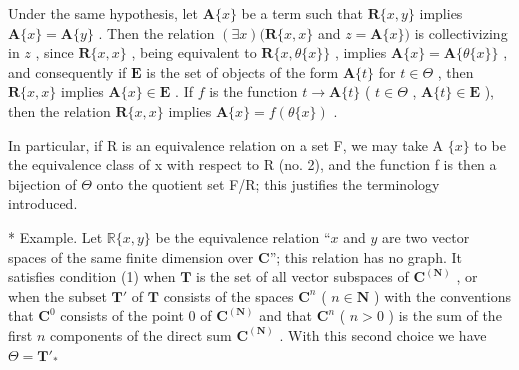 Under the same hypothesis, let \(\mathbf{A}\{x\}\) be a term such that \(\mathbf{R}\{x,y\}\) implies \(\mathbf{A}\{x\} = \mathbf{A}\{y\}\) . Then the relation \((\exists x)(\mathbf{R}\{x,x\}\) and \(z = \mathbf{A}\{x\})\) is collectivizing in \(z\) , since \(\mathbf{R}\{x,x\}\) , being equivalent to \(\mathbf{R}\{x,\theta\{x\}\}\) , implies \(\mathbf{A}\{x\} = \mathbf{A}\{\theta\{x\}\}\) , and consequently if \(\mathbf{E}\) is the set of objects of the form \(\mathbf{A}\{t\}\) for \(t \in \Theta\) , then \(\mathbf{R}\{x,x\}\) implies \(\mathbf{A}\{x\} \in \mathbf{E}\) . If \(f\) is the function \(t \to \mathbf{A}\{t\}\) ( \(t \in \Theta\) , \(\mathbf{A}\{t\} \in \mathbf{E}\) ), then the relation \(\mathbf{R}\{x,x\}\) implies \(\mathbf{A}\{x\} = f(\theta\{x\})\) .

In particular, if R is an equivalence relation on a set F, we may take A \(\{x\}\) to be the equivalence class of x with respect to R (no. 2), and the function f is then a bijection of \(\Theta\) onto the quotient set F/R; this justifies the terminology introduced.

* Example. Let \(\mathbb{R}\{x, y\}\) be the equivalence relation ``\(x\) and \(y\) are two vector spaces of the same finite dimension over \(\mathbf{C}\)''; this relation has no graph. It satisfies condition (1) when \(\mathbf{T}\) is the set of all vector subspaces of \(\mathbf{C}^{(\mathbf{N})}\) , or when the subset \(\mathbf{T}'\) of \(\mathbf{T}\) consists of the spaces \(\mathbf{C}^n\) ( \(n \in \mathbf{N}\) ) with the conventions that \(\mathbf{C}^0\) consists of the point 0 of \(\mathbf{C}^{(\mathbf{N})}\) and that \(\mathbf{C}^n\) ( \(n > 0\) ) is the sum of the first \(n\) components of the direct sum \(\mathbf{C}^{(\mathbf{N})}\) . With this second choice we have \(\Theta = \mathbf{T}'_*\)

